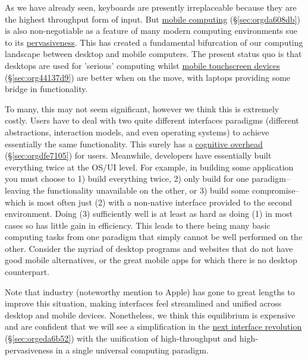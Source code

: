 \documentclass[logo,bsc,singlespacing,parskip]{infthesis}
\begin{document}
As we have already seen, keyboards are presently irreplaceable because they are the highest throughput form of input.
But \hyperref[sec:orgda608db]{mobile computing} (\S \ref{sec:orgda608db}) is also non-negotiable as a feature of many modern computing environments sue to its \hyperref[pervasiveness]{pervasiveness}.
This has created a fundamental bifurcation of our computing landscape between desktop and mobile computers.
The present status quo is that desktops are used for 'serious' computing whilst \hyperref[sec:org44137d9]{mobile touchscreen devices} (\S \ref{sec:org44137d9}) are better when on the move, with laptops providing some bridge in functionality.

To many, this may not seem significant, however we think this is extremely costly.
Users have to deal with two quite different interfaces paradigms (different abstractions, interaction models, and even operating systems) to achieve essentially the same functionality.
This surely has a \hyperref[sec:orgdfe7105]{cognitive overhead} (\S \ref{sec:orgdfe7105}) for users.
Meanwhile, developers have essentially built everything twice at the OS/UI level.
For example, in building some application you must choose to 1) build everything twice, 2) only build for one paradigm-- leaving the functionality unavailable on the other, or 3) build some compromise-- which is most often just (2) with a non-native interface provided to the second environment.
Doing (3) sufficiently well is at least as hard as doing (1) in most cases so has little gain in efficiency.
This leads to there being many basic computing tasks from one paradigm that simply cannot be well performed on the other.
Consider the myriad of desktop programs and websites that do not have good mobile alternatives, or the great mobile apps for which there is no desktop counterpart.

Note that industry (noteworthy mention to Apple) has gone to great lengths to improve this situation, making interfaces feel streamlined and unified across desktop and mobile devices.
Nonetheless, we think this equilibrium is expensive and are confident that we will see a simplification in the \hyperref[sec:orgeda6b52]{next interface revolution} (\S \ref{sec:orgeda6b52}) with the unification of high-throughput and high-pervasiveness in a single universal computing paradigm.
\end{document}
